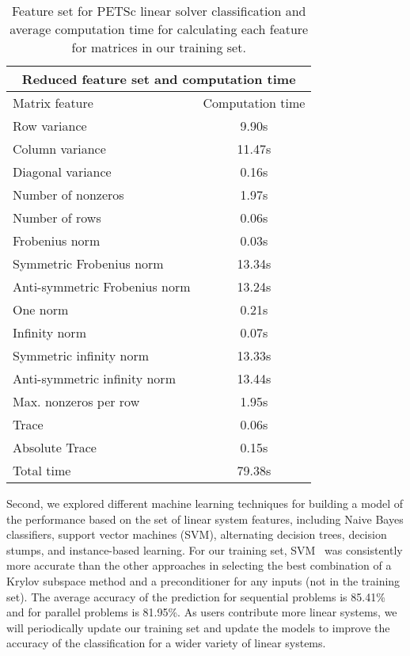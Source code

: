 \documentclass{sig-alternate}
\begin{document}
\begin{table}[htb]
 \centering
    \caption{Feature set for PETSc linear solver classification and average computation time for calculating each feature for matrices in our training set.}
   \label{tab:featureset}
    \begin{tabular}{| l | c |}
    \hline
    \multicolumn{2}{|c|}{Reduced feature set and computation time} \\
    \hline
    \hline
    Matrix feature & Computation time \\ \hline
    Row variance & 9.90s \\ \hline
    Column variance & 11.47s \\ \hline
    Diagonal variance & 0.16s  \\ \hline
    Number of nonzeros & 1.97s  \\ \hline
    Number of rows & 0.06s \\ \hline
    Frobenius norm & 0.03s  \\ \hline
    Symmetric Frobenius norm & 13.34s  \\ \hline
    Anti-symmetric Frobenius norm & 13.24s  \\ \hline
    One norm &  0.21s \\ \hline
    Infinity norm & 0.07s \\ \hline
    Symmetric infinity norm & 13.33s \\ \hline
    Anti-symmetric infinity norm & 13.44s \\ \hline
    Max. nonzeros per row & 1.95s \\ \hline
    Trace & 0.06s  \\ \hline
    Absolute Trace & 0.15s \\ \hline
    \hline
    Total time & 79.38s \\ \hline
   \end{tabular}
\end{table}

Second, we explored different machine learning techniques for building a model of the performance based on the set of linear system 
features, including Naive Bayes classifiers, support vector machines (SVM), alternating decision trees, decision stumps, and instance-based
learning. For our training set, SVM~\cite{svm} was consistently more accurate than the other approaches in 
selecting the best combination of a Krylov subspace method and a preconditioner for any inputs (not in the training set). 
The average accuracy of the prediction for sequential problems is 85.41\% and for parallel problems is 81.95\%. As users contribute 
more linear systems, we will periodically update our training set and update the models to improve the accuracy of 
the classification for a wider variety of linear systems.
\end{document}
